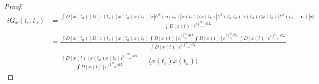 \documentclass[a4paper,11pt]{article}
\newtheorem{proof}{proof}[section]
\begin{document}
\begin{proof}
  \begin{equation*}
    \begin{split}
       iG_x(t_b,t_a)&=\frac{\int D[x(t_a)]D[x(t_b)]x(t_a)x(t_b)\langle x|U^\theta(\infty,t_b)|x(t_b)\rangle\langle x(t_b)|U^\theta(t_b,t_a)|x(t_a)\rangle\langle x(t_a)|U^\theta(t_a,-\infty)|x\rangle}{\int D[x(t)]e^{i\int_{-\infty}^{\infty}dt L}}\\
         &=\frac{\int D[x(t_a)]D[x(t_b)]x(t_a)x(t_b)\int D[x(t)]e^{i\int_{t_b}^{\infty}dt L}\int D[x(t)]e^{i\int_{t_a}^{t_b}dt L}\int D[x(t)]e^{i\int_{-\infty}^{t_a}dt L}}{\int D[x(t)]e^{i\int_{-\infty}^{\infty}dt L}}\\
         &=\frac{\int D[x(t)]x(t_a)x(t_b)e^{i\int_{-\infty}^{\infty}dt L}}{\int D[x(t)]e^{i\int_{-\infty}^{\infty}dt L}}=\langle x(t_b)x(t_a)\rangle
    \end{split}
  \end{equation*}
\end{proof}
\end{document}
